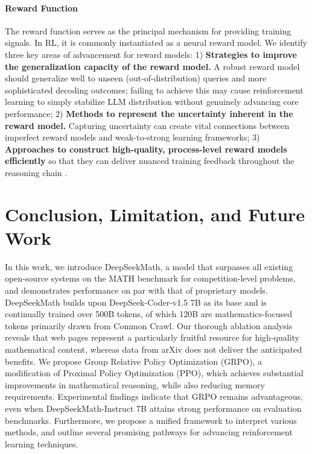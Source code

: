 \begin{itemize}[topsep=0pt]
\begin{itemize}[topsep=0pt]
\paragraph{Reward Function} The reward function serves as the principal mechanism for providing training signals. In RL, it is commonly instantiated as a neural reward model. We identify three key areas of advancement for reward models: 1) \textbf{Strategies to improve the generalization capacity of the reward model.} A robust reward model should generalize well to unseen (out-of-distribution) queries and more sophisticated decoding outcomes; failing to achieve this may cause reinforcement learning to simply stabilize LLM distribution without genuinely advancing core performance; 2) \textbf{Methods to represent the uncertainty inherent in the reward model.} Capturing uncertainty can create vital connections between imperfect reward models and weak-to-strong learning frameworks; 3) \textbf{Approaches to construct high-quality, process-level reward models efficiently} so that they can deliver nuanced training feedback throughout the reasoning chain \citep{lightman2023let,wang2023math}.

\section{Conclusion, Limitation, and Future Work}

In this work, we introduce DeepSeekMath, a model that surpasses all existing open-source systems on the MATH benchmark for competition-level problems, and demonstrates performance on par with that of proprietary models. DeepSeekMath builds upon DeepSeek-Coder-v1.5 7B as its base and is continually trained over 500B tokens, of which 120B are mathematics-focused tokens primarily drawn from Common Crawl. Our thorough ablation analysis reveals that web pages represent a particularly fruitful resource for high-quality mathematical content, whereas data from arXiv does not deliver the anticipated benefits. We propose Group Relative Policy Optimization (GRPO), a modification of Proximal Policy Optimization (PPO), which achieves substantial improvements in mathematical reasoning, while also reducing memory requirements. Experimental findings indicate that GRPO remains advantageous, even when DeepSeekMath-Instruct 7B attains strong performance on evaluation benchmarks. Furthermore, we propose a unified framework to interpret various methods, and outline several promising pathways for advancing reinforcement learning techniques.


\end{itemize}
\end{itemize}
